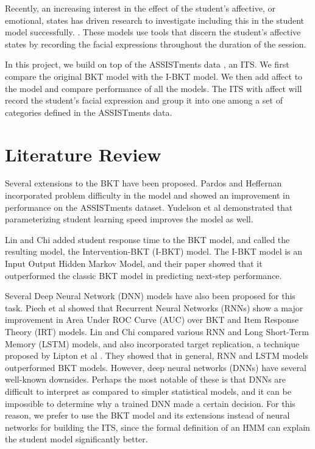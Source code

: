 \documentclass[12pt,a4paper]{article}
\begin{document}
Recently, an increasing interest in the effect of the student's affective, or emotional, states has driven research to investigate including this in the student model successfully. \cite{spaulding2016affect} \cite{schultz2014tracing}. These models use tools that discern the student's affective states by recording the facial expressions throughout the duration of the session. 

In this project, we build on top of the ASSISTments data \cite{assistmentsdata}, an ITS. We first compare the original BKT model with the I-BKT model. We then add affect to the model and compare performance of all the models. The ITS with affect will record the student's facial expression and group it into one among a set of categories defined in the ASSISTments data.

\section{Literature Review}
Several extensions to the BKT have been proposed. Pardos and Heffernan \cite{pardos2011kt} incorporated problem difficulty in the model and showed an improvement in performance on the ASSISTments dataset. Yudelson et al \cite{yudelson2013individualized} demonstrated that parameterizing student learning speed improves the model as well. 

Lin and Chi \cite{lin2016intervention} added student response time to the BKT model, and called the resulting model, the Intervention-BKT (I-BKT) model. The I-BKT model is an Input Output Hidden Markov Model, and their paper showed that it outperformed the classic BKT model in predicting next-step performance.

Several Deep Neural Network (DNN) models have also been proposed for this task. Piech et al \cite{piech2015deep} showed that Recurrent Neural Networks (RNNs) show a major improvement in Area Under ROC Curve (AUC) over BKT and Item Response Theory (IRT) models. Lin and Chi \cite{lin2017comparisons} compared various RNN and Long Short-Term Memory (LSTM) models, and also incorporated target replication, a technique proposed by Lipton et al \cite{lipton2015learning}. They showed that in general, RNN and LSTM models outperformed BKT models. However, deep neural networks (DNNs) have several well-known downsides. Perhaps the most notable of these is that DNNs are difficult to interpret as compared to simpler statistical models, and it can be impossible to determine why a trained DNN made a certain decision. For this reason, we prefer to use the BKT model and its extensions instead of neural networks for building the ITS, since the formal definition of an HMM can explain the student model significantly better.
\end{document}

